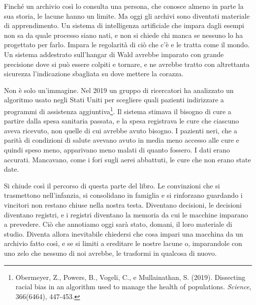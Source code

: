 Finché un archivio così lo consulta una persona, che conosce almeno in parte la sua storia, le lacune hanno un limite. Ma oggi gli archivi sono diventati materiale di apprendimento. Un sistema di intelligenza artificiale che impara dagli esempi non sa da quale processo siano nati, e non si chiede chi manca se nessuno lo ha progettato per farlo. Impara le regolarità di ciò che c'è e le tratta come il mondo. Un sistema addestrato sull'hangar di Wald avrebbe imparato con grande precisione dove si può essere colpiti e tornare, e ne avrebbe tratto con altrettanta sicurezza l'indicazione sbagliata su dove mettere la corazza.

Non è solo un'immagine. Nel 2019 un gruppo di ricercatori ha analizzato un algoritmo usato negli Stati Uniti per scegliere quali pazienti indirizzare a programmi di assistenza aggiuntiva\footnote{Obermeyer, Z., Powers, B., Vogeli, C., e Mullainathan, S. (2019). Dissecting racial bias in an algorithm used to manage the health of populations. \textit{Science}, 366(6464), 447-453.}. Il sistema stimava il bisogno di cure a partire dalla spesa sanitaria passata, e la spesa registrava le cure che ciascuno aveva ricevuto, non quelle di cui avrebbe avuto bisogno. I pazienti neri, che a parità di condizioni di salute avevano avuto in media meno accesso alle cure e quindi speso meno, apparivano meno malati di quanto fossero. I dati erano accurati. Mancavano, come i fori sugli aerei abbattuti, le cure che non erano state date.


Si chiude così il percorso di questa parte del libro. Le convinzioni che si trasmettono nell'infanzia, si consolidano in famiglia e si rinforzano guardando i vincitori non restano chiuse nella nostra testa. Diventano decisioni, le decisioni diventano registri, e i registri diventano la memoria da cui le macchine imparano a prevedere. Ciò che annotiamo oggi sarà stato, domani, il loro materiale di studio. Diventa allora inevitabile chiedersi che cosa impari una macchina da un archivio fatto così, e se si limiti a ereditare le nostre lacune o, imparandole con uno zelo che nessuno di noi avrebbe, le trasformi in qualcosa di nuovo.
